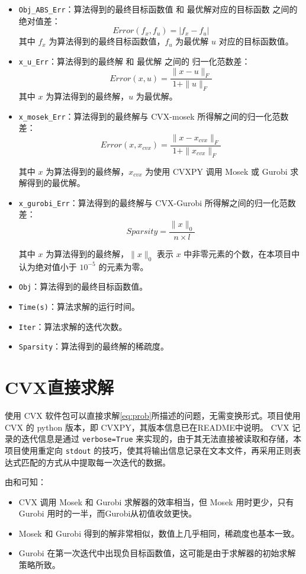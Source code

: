 \documentclass[journal, a4paper]{IEEEtran}
\begin{document}
\begin{itemize}
    \item \texttt{Obj\_ABS\_Err}：算法得到的最终目标函数值 和 最优解对应的目标函数 之间的绝对值差：
    $$
    Error(f_{x}, f_{u}) = |f_{x} - f_{u}|
    $$
    其中 $f_{x}$ 为算法得到的最终目标函数值，$f_{u}$ 为最优解 $u$ 对应的目标函数值。

    \item \texttt{x\_u\_Err}：算法得到的最终解 和 最优解 之间的 归一化范数差：
    $$
    Error(x, u) = \frac{\|x - u\|_F}{1 + \|u\|_F}
    $$
    其中 $x$ 为算法得到的最终解，$u$ 为最优解。

    \item \texttt{x\_mosek\_Err}：算法得到的最终解与 CVX-mosek 所得解之间的归一化范数差：
    $$
    Error(x, x_{cvx}) = \frac{\|x - x_{cvx}\|_F}{1 + \|x_{cvx}\|_F}
    $$

    其中 $x$ 为算法得到的最终解，$x_{cvx}$ 为使用 CVXPY 调用 Mosek 或 Gurobi 求解得到的最优解。
    \item \texttt{x\_gurobi\_Err}：算法得到的最终解与 CVX-Gurobi 所得解之间的归一化范数差：
    $$
    Sparsity = \frac{\|x\|_0}{n \times l}
    $$

    其中 $x$ 为算法得到的最终解，$\|x\|_0$ 表示 $x$ 中非零元素的个数，在本项目中认为绝对值小于 $10^{-5}$ 的元素为零。

    \item \texttt{Obj}：算法得到的最终目标函数值。
    \item \texttt{Time(s)}：算法求解的运行时间。
    \item \texttt{Iter}：算法求解的迭代次数。
    \item \texttt{Sparsity}：算法得到的最终解的稀疏度。
\end{itemize}

\section{\textbf{CVX直接求解}}
使用 CVX 软件包可以直接求解\ref{eq:prob}所描述的问题，无需变换形式。项目使用 CVX 的 python 版本，即 CVXPY，其版本信息已在README中说明。
CVX 记录的迭代信息是通过 \texttt{verbose=True} 来实现的，由于其无法直接被读取和存储，本项目使用重定向 \texttt{stdout} 的技巧\cite{stackoverflow}，使其将输出信息记录在文本文件，再采用正则表达式匹配的方式从中提取每一次迭代的数据。

由和可知：
\begin{itemize}
    \item CVX 调用 Mosek 和 Gurobi 求解器的效率相当，但 Mosek 用时更少，只有 Gurobi 用时的一半，而Gurobi从初值收敛更快。
    \item Mosek 和 Gurobi 得到的解非常相似，数值上几乎相同，稀疏度也基本一致。
    \item Gurobi 在第一次迭代中出现负目标函数值，这可能是由于求解器的初始求解策略所致。
\end{itemize}
\end{document}
